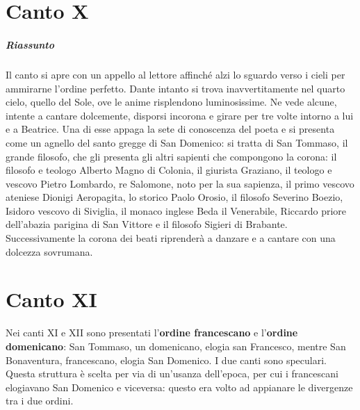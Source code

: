 \documentclass[a4paper, twoside, titlepage]{book}
\begin{document}
\chapter{Canto X}

\paragraph{Riassunto} Il canto si apre con un appello al lettore affinché alzi lo sguardo verso i cieli per ammirarne l'ordine perfetto. Dante intanto si trova inavvertitamente nel quarto cielo, quello del Sole, ove le anime risplendono luminosissime. Ne vede alcune, intente a cantare dolcemente, disporsi incorona e girare per tre volte intorno a lui e a Beatrice. Una di esse appaga la sete di conoscenza del poeta e si presenta come un agnello del santo gregge di San Domenico: si tratta di San Tommaso, il grande filosofo, che gli presenta gli altri sapienti che compongono la corona: il filosofo e teologo Alberto Magno di Colonia, il giurista Graziano, il teologo e vescovo Pietro Lombardo, re Salomone, noto per la sua sapienza, il primo vescovo ateniese Dionigi Aeropagita, lo storico Paolo Orosio, il filosofo Severino Boezio, Isidoro vescovo di Siviglia, il monaco inglese Beda il Venerabile, Riccardo priore dell'abazia parigina di San Vittore e il filosofo Sigieri di Brabante. Successivamente la corona dei beati riprenderà a danzare e a cantare con una dolcezza sovrumana.

\chapter{Canto XI}

Nei canti XI e XII sono presentati l'\textbf{ordine francescano} e l'\textbf{ordine domenicano}: San Tommaso, un domenicano, elogia san Francesco, mentre San Bonaventura, francescano, elogia San Domenico. I due canti sono speculari.
Questa struttura è scelta per via di un'usanza dell'epoca, per cui i francescani elogiavano San Domenico e viceversa: questo era volto ad appianare le divergenze tra i due ordini.
\end{document}
